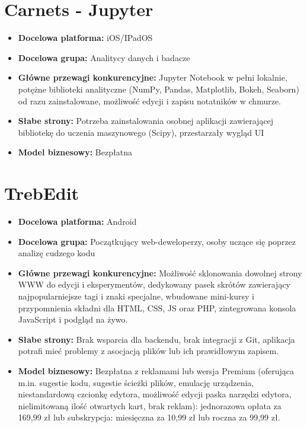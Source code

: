 \newpage
\section{Carnets - Jupyter}
\begin{itemize}
    
    \item \textbf{Docelowa platforma:} iOS/IPadOS
    \item \textbf{Docelowa grupa:} Analitycy danych i badacze 
    \item \textbf{Główne przewagi konkurencyjne:} Jupyter Notebook w pełni lokalnie, potężne biblioteki analityczne (NumPy, Pandas, Matplotlib, Bokeh, Seaborn) od razu zainstalowane, możliwość edycji i zapisu notatników w chmurze. 
    \item \textbf{Słabe strony:} Potrzeba zainstalowania osobnej aplikacji zawierającej bibliotekę do uczenia maszynowego (Scipy), przestarzały wygląd UI
    \item \textbf{Model biznesowy:} Bezpłatna 
\end{itemize}

\newpage
\section{TrebEdit} 
\begin{itemize}
    
    \item \textbf{Docelowa platforma:} Android
    \item \textbf{Docelowa grupa:} Początkujący web-deweloperzy, osoby uczące się poprzez analizę cudzego kodu 
    \item \textbf{Główne przewagi konkurencyjne:} Możliwość sklonowania dowolnej strony WWW do edycji i eksperymentów, dedykowany pasek skrótów zawierający najpopularniejsze tagi i znaki specjalne, wbudowane mini-kursy i przypomnienia składni dla HTML, CSS, JS oraz PHP, zintegrowana konsola JavaScript i podgląd na żywo.
    \item \textbf{Słabe strony:} Brak wsparcia dla backendu, brak integracji z Git, aplikacja potrafi mieć problemy z asocjacją plików lub ich prawidłowym zapisem. 
    \item \textbf{Model biznesowy:} Bezpłatna z reklamami lub wersja Premium (oferująca m.in. sugestie kodu, sugestie ścieżki plików, emulację urządzenia, niestandardową czcionkę edytora, możliwość edycji paska narzędzi edytora, nielimitowaną ilość otwartych kart, brak reklam): jednorazowa opłata za 169,99 zł lub subskrypcja: miesięczna za 10,99 zł lub roczna za 99,99 zł. 
\end{itemize}
